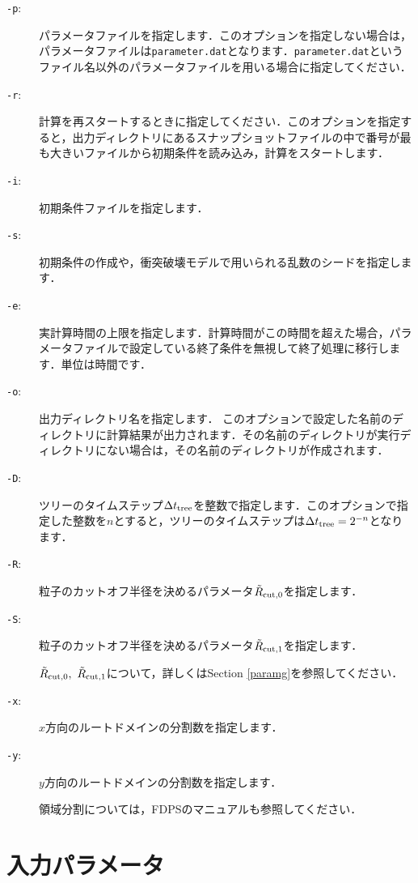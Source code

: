 \documentclass[12pt,a4paper,dvipdfmx]{jsarticle}
\begin{document}
\begin{description}
\item[\texttt{-p}:]
パラメータファイルを指定します．このオプションを指定しない場合は，パラメータファイルは\texttt{parameter.dat}となります．\texttt{parameter.dat}というファイル名以外のパラメータファイルを用いる場合に指定してください．
\item[\texttt{-r}:]
計算を再スタートするときに指定してください．このオプションを指定すると，出力ディレクトリにあるスナップショットファイルの中で番号が最も大きいファイルから初期条件を読み込み，計算をスタートします．
\item[\texttt{-i}:]
初期条件ファイルを指定します．
\item[\texttt{-s}:]
初期条件の作成や，衝突破壊モデルで用いられる乱数のシードを指定します．
\item[\texttt{-e}:]
実計算時間の上限を指定します．計算時間がこの時間を超えた場合，パラメータファイルで設定している終了条件を無視して終了処理に移行します．単位は時間です．
\item[\texttt{-o}:]
出力ディレクトリ名を指定します．
このオプションで設定した名前のディレクトリに計算結果が出力されます．その名前のディレクトリが実行ディレクトリにない場合は，その名前のディレクトリが作成されます．
\item[\texttt{-D}:]
ツリーのタイムステップ$\Delta t_{\rm tree}$を整数で指定します．このオプションで指定した整数を$n$とすると，ツリーのタイムステップは$\Delta t_{\rm tree}=2^{-n}$となります．
\item[\texttt{-R}:]
粒子のカットオフ半径を決めるパラメータ$\tilde{R}_{\rm cut,0}$を指定します．
\item[\texttt{-S}:]
粒子のカットオフ半径を決めるパラメータ$\tilde{R}_{\rm cut,1}$を指定します．

$\tilde{R}_{\rm cut,0},\ \tilde{R}_{\rm cut,1}$について，詳しくはSection \ref{paramg}を参照してください．
\item[\texttt{-x}:]
$x$方向のルートドメインの分割数を指定します．
\item[\texttt{-y}:]
$y$方向のルートドメインの分割数を指定します．

領域分割については，FDPSのマニュアルも参照してください．


\end{description}

  
\section{入力パラメータ\label{parameter}}
\end{document}
